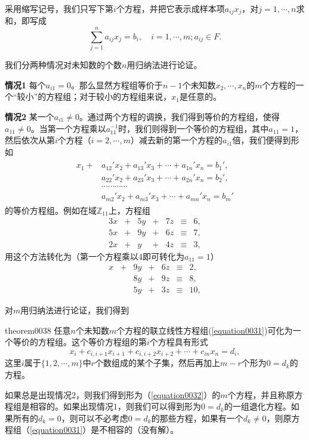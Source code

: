 采用缩写记号，我们只写下第$i$个方程，并把它表示成样本项$a_{ij}x_j$，对$j=1,\cdots,n$求和，即写成
\[
\sum_{j=1}^{n}{a_{ij}x_j}=b_i,\quad i=1,\cdots,m; a_{ij} \in F.
\]

我们分两种情况对未知数的个数$n$用归纳法进行论证。

\textbf{情况1} \quad 每个$a_{i1}=0$。那么显然方程组等价于$n-1$个未知数$x_2,\cdots,x_n$的$m$个方程的一个“较小”的方程组；对于较小的方程组来说，$x_1$是任意的。

\textbf{情况2} \quad 某一个$a_{i1} \neq 0$。通过两个方程的调换，我们得到等价的方程组，使得$a_{11} \neq 0$。当第一个方程乘以$a_{11}^{-1}$时，我们则得到一个等价的方程组，其中$a_{11}=1$，然后依次从第$i$个方程（$i=2,\cdots,m$）减去新的第一个方程的$a_{i1}$倍，我们便得到形如
\begin{gather}\label{equation0032}
\begin{aligned}
x_1+&a_{12}'x_2+a_{13}'x_3+\cdots+a_{1n}'x_n=b_1',\\
&a_{22}'x_2+a_{23}'x_3+\cdots+a_{2n}'x_n=b_2',\\
&\cdots\cdots\cdots\cdots\\
&a_{m2}'x_2+a_{m3}'x_3+\cdots+a_{mn}'x_n=b_m'
\end{aligned}
\end{gather}
的等价方程组。例如在域$\mathbb{Z}_11$上，方程组
\[
\begin{array}{rcrcrcl}
3x&+&5y&+&7z&\equiv&6,\\
5x&+&9y&+&6z&\equiv&7,\\
2x&+&y&+&4z&\equiv&3,
\end{array}
\]
用这个方法转化为（第一个方程乘以4即可转化为$a_{11}=1$）
\[
\begin{array}{rcrcrcl}
x&+&9y&+&6z&\equiv&2,\\
&&8y&+&9z&\equiv&8,\\
&&5y&+&3z&\equiv&10,
\end{array}
\]

对$m$用归纳法进行论证，我们得到
\begin{theorem}{}{theorem0038}
任意$n$个未知数$m$个方程的联立线性方程组(\ref{equation0031})可化为一个等价的方程组。这个等价方程组的第$i$个方程具有形式
\begin{equation}\label{equation0033}
x_i + c_{i,i+1}x_{i+1}+c_{i,i+2}x_{i+2}+\cdots+c_{in}x_n=d_i,
\end{equation}
这里$i$属于$\{1,2,\cdots,m\}$中$r$个数组成的某个子集，然后再加上$m-r$个形为$0=d_k$的方程。
\end{theorem}

如果总是出现情况2，则我们得到形为（\ref{equation0032}）的$m$个方程，并且称原方程组是相容的。如果出现情况1，则我们可以得到形为$0=d_k$的一组退化方程。如果所有的$d_k=0$，则可以不必考虑$0=d_k$的那些方程，如果有一个$d_k \neq 0$，则原方程组（\ref{equation0031}）是不相容的（没有解）。

